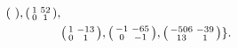 \begin{itemize}
\begin{align*}
\begin{psmallmatrix}
\end{psmallmatrix},\begin{psmallmatrix}
1 & 52 \\ 0 & 1
\end{psmallmatrix},\\ & \begin{psmallmatrix}
1 & -13 \\ 0 & 1
\end{psmallmatrix},\begin{psmallmatrix}
-1 & -65 \\ 0 & -1
\end{psmallmatrix},\begin{psmallmatrix}
-506 & -39 \\ 13 & 1
\end{psmallmatrix}\}.
\end{align*}


\end{itemize}

